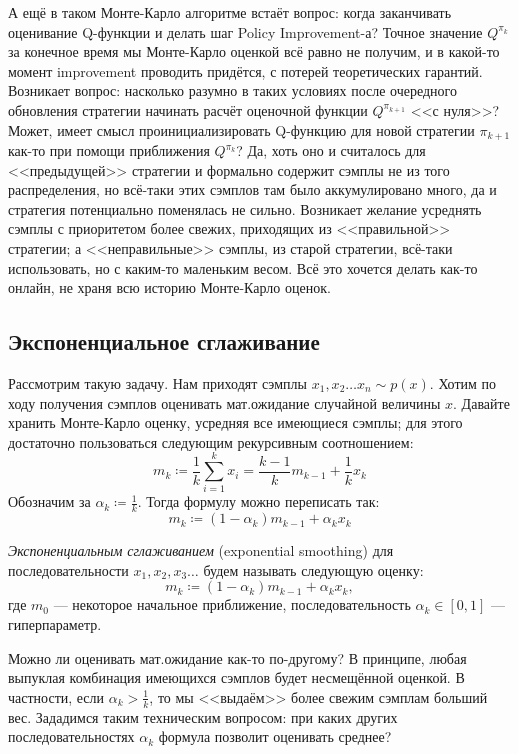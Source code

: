 А ещё в таком Монте-Карло алгоритме встаёт вопрос: когда заканчивать оценивание Q-функции и делать шаг Policy Improvement-а? Точное значение $Q^{\pi_k}$ за конечное время мы Монте-Карло оценкой всё равно не получим, и в какой-то момент improvement проводить придётся, с потерей теоретических гарантий. Возникает вопрос: насколько разумно в таких условиях после очередного обновления стратегии начинать расчёт оценочной функции $Q^{\pi_{k+1}}$ <<с нуля>>? Может, имеет смысл проинициализировать Q-функцию для новой стратегии $\pi_{k+1}$ как-то при помощи приближения $Q^{\pi_k}$? Да, хоть оно и считалось для <<предыдущей>> стратегии и формально содержит сэмплы не из того распределения, но всё-таки этих сэмплов там было аккумулировано много, да и стратегия потенциально поменялась не сильно. Возникает желание усреднять сэмплы с приоритетом более свежих, приходящих из <<правильной>> стратегии; а <<неправильные>> сэмплы, из старой стратегии, всё-таки использовать, но с каким-то маленьким весом. Всё это хочется делать как-то онлайн, не храня всю историю Монте-Карло оценок.

\subsection{Экспоненциальное сглаживание}

Рассмотрим такую задачу. Нам приходят сэмплы $x_1, x_2 \dots x_n \sim p(x)$. Хотим по ходу получения сэмплов оценивать мат.ожидание случайной величины $x$. Давайте хранить Монте-Карло оценку, усредняя все имеющиеся сэмплы; для этого достаточно пользоваться следующим рекурсивным соотношением:
$$m_{k} \coloneqq \frac{1}{k} \sum_{i=1}^{k} x_i = \frac{k - 1}{k}m_{k-1} + \frac{1}{k}x_{k}$$
Обозначим за $\alpha_k \coloneqq \frac{1}{k}$. Тогда формулу можно переписать так:
$$m_{k} \coloneqq (1 - \alpha_k)m_{k-1} + \alpha_k x_{k}$$

\begin{definition}
\emph{Экспоненциальным сглаживанием} (exponential smoothing) для последовательности $x_1, x_2, x_3 \dots$ будем называть следующую оценку:
$$m_{k} \coloneqq (1 - \alpha_k) m_{k - 1} + \alpha_k x_k,$$
где $m_0$ --- некоторое начальное приближение, последовательность $\alpha_k \in [0, 1]$ --- гиперпараметр. 
\end{definition}

Можно ли оценивать мат.ожидание как-то по-другому? В принципе, любая выпуклая комбинация имеющихся сэмплов будет несмещённой оценкой. В частности, если $\alpha_k > \frac{1}{k}$, то мы <<выдаём>> более свежим сэмплам больший вес. Зададимся таким техническим вопросом: при каких других последовательностях $\alpha_k$ формула позволит оценивать среднее?


